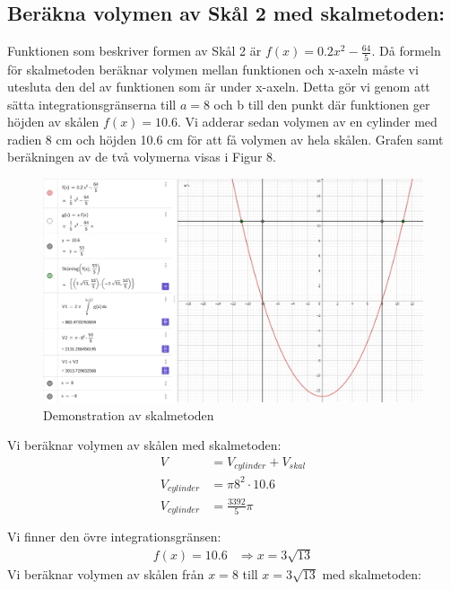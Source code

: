 \documentclass[12pt]{article}
\begin{document}
\subsection*{Beräkna volymen av Skål 2 med skalmetoden:}
Funktionen som beskriver formen av Skål 2 är $f(x)=0.2x^2-\frac{64}{5}$. Då formeln för skalmetoden beräknar volymen mellan funktionen och x-axeln måste vi utesluta den del av funktionen som är under x-axeln. Detta gör vi genom att sätta integrationsgränserna till $a=8$ och b till den punkt där funktionen ger höjden av skålen $f(x)=10.6$. Vi adderar sedan volymen av en cylinder med radien 8 cm och höjden 10.6 cm för att få volymen av hela skålen. Grafen samt beräkningen av de två volymerna visas i Figur 8.
\begin{figure}[H]
    \centering
    \renewcommand{\thefigure}{8}
    \includegraphics[width=\textwidth]{figur8.png}
    \caption{Demonstration av skalmetoden}
\end{figure}
Vi beräknar volymen av skålen med skalmetoden:\\
\begin{align*}
    V&=V_{cylinder}+V_{skal}\\
    V_{cylinder}&=\pi 8^2\cdot 10.6\\
    V_{cylinder}&=\frac{3392}{5}\pi\\
    \\
\end{align*}
Vi finner den övre integrationsgränsen:
\begin{align*}
    f(x)=10.6&\Rightarrow x=3\sqrt{13}
\end{align*}
Vi beräknar volymen av skålen från $x=8$ till $x=3\sqrt{13}$ med skalmetoden:
\end{document}
